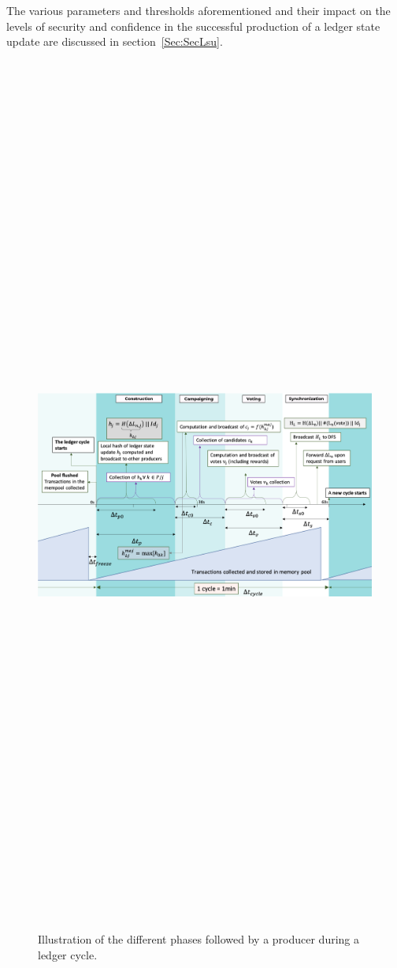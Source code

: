 The various parameters and thresholds aforementioned and their impact on the levels of security and confidence in the successful production of a ledger state update are discussed in section~\ref{Sec:SecLsu}.
\newpage
\begin{landscape}
\begin{figure}
    \includegraphics[width=22cm,height=42cm,keepaspectratio]{Figures/Catalyst_cycle}
    \caption{\label{fig:cycle}Illustration of the different phases followed by a producer during a ledger cycle.}
\end{figure}
\end{landscape}


